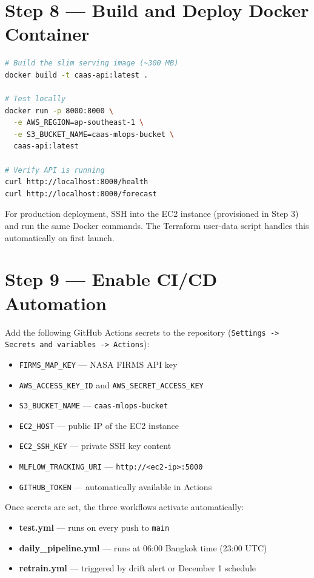\section{Step 8 — Build and Deploy Docker Container}

\begin{lstlisting}[language=bash]
# Build the slim serving image (~300 MB)
docker build -t caas-api:latest .

# Test locally
docker run -p 8000:8000 \
  -e AWS_REGION=ap-southeast-1 \
  -e S3_BUCKET_NAME=caas-mlops-bucket \
  caas-api:latest

# Verify API is running
curl http://localhost:8000/health
curl http://localhost:8000/forecast
\end{lstlisting}

For production deployment, SSH into the EC2 instance (provisioned in Step 3)
and run the same Docker commands. The Terraform user-data script handles this
automatically on first launch.

\section{Step 9 — Enable CI/CD Automation}

Add the following GitHub Actions secrets to the repository
(\texttt{Settings -> Secrets and variables -> Actions}):

\begin{itemize}
  \item \texttt{FIRMS\_MAP\_KEY} --- NASA FIRMS API key
  \item \texttt{AWS\_ACCESS\_KEY\_ID} and \texttt{AWS\_SECRET\_ACCESS\_KEY}
  \item \texttt{S3\_BUCKET\_NAME} --- \texttt{caas-mlops-bucket}
  \item \texttt{EC2\_HOST} --- public IP of the EC2 instance
  \item \texttt{EC2\_SSH\_KEY} --- private SSH key content
  \item \texttt{MLFLOW\_TRACKING\_URI} --- \texttt{http://<ec2-ip>:5000}
  \item \texttt{GITHUB\_TOKEN} --- automatically available in Actions
\end{itemize}

Once secrets are set, the three workflows activate automatically:

\begin{itemize}
  \item \textbf{test.yml} --- runs on every push to \texttt{main}
  \item \textbf{daily\_pipeline.yml} --- runs at 06:00 Bangkok time (23:00 UTC)
  \item \textbf{retrain.yml} --- triggered by drift alert or December 1 schedule
\end{itemize}

